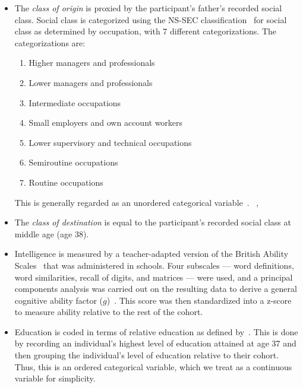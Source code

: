 \begin{itemize}[noitemsep,topsep=0pt]
\item  The \textit{class of origin} is proxied by the participant's father's recorded social class. 
Social class is categorized using the NS-SEC classification~\citep{onsnd} for social class as determined by 
occupation, with 7 different categorizations. The categorizations are: 
\begin{enumerate}[noitemsep,topsep=0pt]
    \item Higher managers and professionals
    \item Lower managers and professionals
    \item Intermediate occupations
    \item Small employers and own account workers
    \item Lower supervisory and technical occupations
    \item Semiroutine occupations
    \item Routine occupations 
\end{enumerate}
This is generally regarded as an unordered categorical 
variable~\citep{kuhaetal2021}. ~\cite{kuhaetal2021}, 


\item  The \textit{class of destination} is equal to the participant's recorded social class at middle 
age (age 38). 
\item Intelligence is measured by a teacher-adapted version of the British Ability Scales~\citep{hill2005} 
that was administered in schools. Four subscales --- word definitions, word similarities, 
recall of digits, and matrices --- were used, and a principal components analysis was carried out on the 
resulting data to derive a general cognitive ability factor ($g$)~\citep{galeetal2007}. This score was 
then standardized into a z-score to measure ability relative to the rest of the cohort. 
\item  Education is coded in terms of relative education as defined by~\cite{bukodigoldthorpe2016}. This is
done by recording an individual's highest level of education attained at age 37 and then grouping the 
individual's level of education relative to their cohort. Thus, this is an ordered categorical variable,
which we treat as a continuous variable for simplicity. 
\end{itemize}

